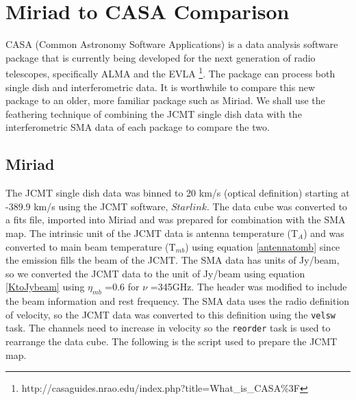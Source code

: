 \chapter{Miriad to CASA Comparison}\label{miriadtocasa}

CASA (Common Astronomy Software Applications) is a data analysis software package that is currently being developed for the next generation of radio telescopes, specifically ALMA and the EVLA \footnote{http://casaguides.nrao.edu/index.php?title=What\_is\_CASA$\%$3F}. The package can process both single dish and interferometric data. It is worthwhile to compare this new package to an older, more familiar package such as Miriad. We shall use the feathering technique of combining the JCMT single dish data with the interferometric SMA data of each package to compare the two.

\section{Miriad}

The JCMT single dish data was binned to 20 km/s (optical definition) starting at -389.9 km/s using the JCMT software, $Starlink$. The data cube was converted to a fits file, imported into Miriad and was prepared for combination with the SMA map. The intrinsic unit of the JCMT data is antenna temperature (T$_{A}$) and was converted to main beam temperature (T$_{mb}$) using equation \ref{antennatomb} since the emission fills the beam of the JCMT. The SMA data has units of Jy/beam, so we converted the JCMT data to the unit of Jy/beam using equation \ref{KtoJybeam} using $\eta_{mb}$ =0.6 for $\nu$ =345GHz. The header was modified to include the beam information and rest frequency. The SMA data uses the radio definition of velocity, so the JCMT data was converted to this definition using the \verb=velsw= task. The channels need to increase in velocity so the \verb=reorder= task is used to rearrange the data cube. The following is the script used to prepare the JCMT map.

